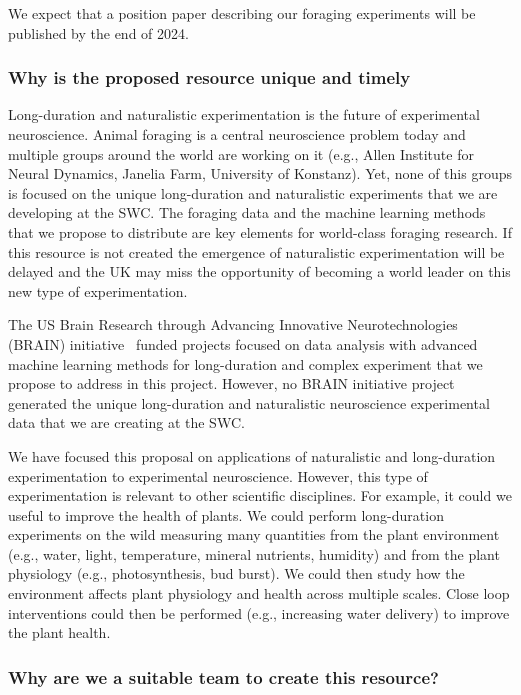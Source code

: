 We expect that a position paper describing our foraging experiments will be
published by the end of 2024.

\subsubsection*{Why is the proposed resource unique and timely}


Long-duration and naturalistic experimentation is the future of experimental
neuroscience.  Animal foraging is a central neuroscience problem today and
multiple groups around the world are working on it (e.g., Allen Institute for
Neural Dynamics, Janelia Farm, University of Konstanz). Yet, none of this
groups is focused on the unique long-duration and naturalistic experiments that
we are developing at the SWC.
%
The foraging data and the machine learning methods that we propose to
distribute are key elements for world-class foraging research.
%
If this resource is not created the emergence of naturalistic experimentation
will be delayed and the UK may miss the opportunity of becoming a world leader
on this new type of experimentation.

The US Brain Research through Advancing Innovative Neurotechnologies (BRAIN)
initiative~\citep{jorgensonEtAl15} funded projects focused on data analysis
with advanced machine learning methods for long-duration and complex experiment
that we propose to address in this project. However, no BRAIN initiative
project generated the unique long-duration and naturalistic neuroscience
experimental data that we are creating at the SWC.

We have focused this proposal on applications of naturalistic and long-duration
experimentation to experimental neuroscience. However, this type of
experimentation is relevant to other scientific disciplines. For example, it
could we useful to improve the health of plants. We could perform long-duration
experiments on the wild measuring many quantities from the plant environment
(e.g., water, light, temperature, mineral nutrients, humidity) and from the
plant physiology (e.g., photosynthesis, bud burst). We could then study how the
environment affects plant physiology and health across multiple scales. Close
loop interventions could then be performed (e.g., increasing water delivery) to
improve the plant health.

\subsubsection*{Why are we a suitable team to create this resource?}

